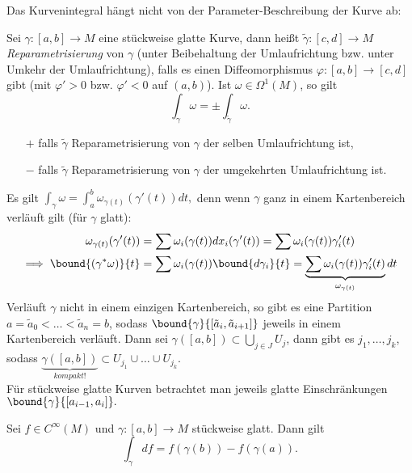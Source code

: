 Das Kurvenintegral hängt nicht von der Parameter-Beschreibung der Kurve ab:

\begin{lem}
	Sei $ \gamma: [a,b] \to M $ eine stückweise glatte Kurve, dann heißt $ \tilde{\gamma}: [c,d] \to M $ \emph{Reparametrisierung} von $\gamma$ (unter Beibehaltung der Umlaufrichtung bzw. unter Umkehr der Umlaufrichtung), falls es einen Diffeomorphismus $\varphi: [a,b] \to [c,d]$ gibt (mit $\varphi' > 0$ bzw. $\varphi' < 0$ auf $(a,b)$). Ist $\omega \in \Omega^1(M)$, so gilt
	\[ \int_\gamma \omega = \pm \int_{\tilde{\gamma}} \omega. \]
	\begin{itemize}
		\item[$+$] falls $\tilde{\gamma}$ Reparametrisierung von $\gamma$ der selben Umlaufrichtung ist,
		\item[$-$] falls $\tilde{\gamma}$ Reparametrisierung von $\gamma$ der umgekehrten Umlaufrichtung ist.
	\end{itemize}
\end{lem}

\begin{rem*}
	Es gilt $ \int_\gamma \omega = \int_a^b \omega_{\gamma(t)} (\gamma'(t))dt, $ denn wenn $\gamma$ ganz in einem Kartenbereich verläuft gilt (für $\gamma$ glatt):
	\begin{align*}
		\omega_{\gamma(t)} (\gamma'(t)) &= \sum \omega_i (\gamma(t)) dx_i (\gamma'(t))
			= \sum \omega_i(\gamma(t)) \gamma_i' (t)\\
		\implies \bound{(\gamma^*\omega)}{t} &= \sum \omega_i (\gamma(t)) \bound{d\gamma_i}{t}
			= \underbrace{\sum \omega_i (\gamma(t)) \gamma_i'(t)}_{\omega_{\gamma (t)}} dt
	\end{align*}
	Verläuft $\gamma$ nicht in einem einzigen Kartenbereich, so gibt es eine Partition $ a=\tilde{a}_0 < \dots < \tilde{a}_n = b $, sodass $ \bound{\gamma}{[\tilde{a}_i,\tilde{a}_{i+1}]} $ jeweils in einem Kartenbereich verläuft. Dann sei $ \gamma([a,b]) \subset \bigcup_{j \in J} U_j $, dann gibt es $ j_1,\dotsc,j_k$, sodass $ \underbrace{\gamma([a,b])}_{kompakt!} \subset U_{j_1} \cup \dots \cup U_{j_k}. $\\
	Für stückweise glatte Kurven betrachtet man jeweils glatte Einschränkungen $ \bound{\gamma}{[a_{i-1},a_i]}. $
\end{rem*}

\begin{thm}\label{3.33}
	Sei $ f \in C^\infty(M) $ und $ \gamma:[a,b] \to M $ stückweise glatt. Dann gilt
	\[ \int_\gamma df = f(\gamma(b)) - f(\gamma(a)). \]
\end{thm}